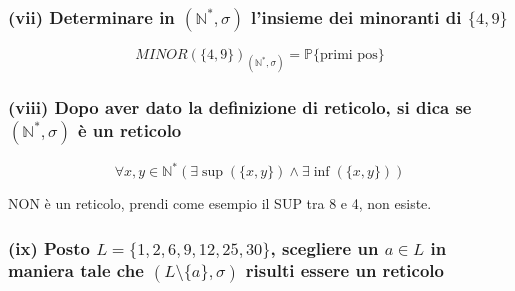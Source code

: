 \subsubsection*{(vii) Determinare in $(\mathbb{N}^*, \sigma)$ l'insieme dei minoranti di $\{4, 9\}$}




$$MINOR(\{4, 9\})_{(\mathbb{N}^*, \sigma)} = \mathbb{P} \{\text{primi pos}\}$$

\subsubsection*{(viii) Dopo aver dato la definizione di reticolo, si dica se $(\mathbb{N}^*, \sigma)$ è un reticolo}

$$\forall x, y \in \mathbb{N}^* \left( \exists \sup(\{x, y\}) \land \exists \inf(\{x, y\}) \right)$$

NON è un reticolo, prendi come esempio il SUP tra 8 e 4, non esiste.

\subsubsection*{(ix) Posto $L = \{1, 2, 6, 9, 12, 25, 30\}$, scegliere un $a \in L$ in maniera tale che $(L \setminus \{a\}, \sigma)$ risulti essere un reticolo}

